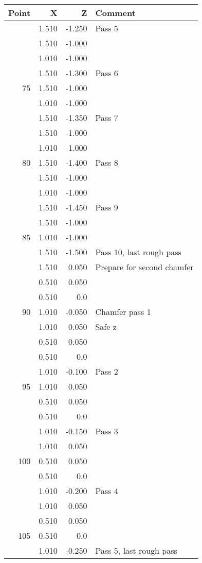 \documentclass{article}
\begin{document}
\newpage

\begin{figure}[H]
\begin{tabular}{rrrl} \toprule
	Point & X & Z & Comment \\ 
	\midrule
	& 1.510 & -1.250 & Pass 5 \\
	& 1.510 & -1.000 & \\
	& 1.010 & -1.000 & \\ 
	& 1.510 & -1.300 & Pass 6\\
	75 & 1.510 & -1.000 & \\
	& 1.010 & -1.000 & \\
	& 1.510 & -1.350 & Pass 7 \\
	& 1.510 & -1.000 & \\
	& 1.010 & -1.000 & \\
	80 & 1.510 & -1.400 & Pass 8 \\
	& 1.510 & -1.000 & \\
	& 1.010 & -1.000 & \\
	& 1.510 & -1.450 & Pass 9 \\
	& 1.510 & -1.000 & \\
	85 & 1.010 & -1.000 & \\
	& 1.510 & -1.500 & Pass 10, last rough pass \\
	& 1.510 & 0.050 & Prepare for second chamfer \\
	& 0.510 & 0.050 & \\
	& 0.510 & 0.0 & \\
	90 & 1.010 & -0.050 & Chamfer pass 1 \\
	& 1.010 & 0.050 & Safe z \\
	& 0.510 & 0.050 & \\
	& 0.510 & 0.0 & \\
	& 1.010 & -0.100 & Pass 2 \\
	95 & 1.010 & 0.050 & \\
	& 0.510 & 0.050 & \\
	& 0.510 & 0.0 & \\
	& 1.010 & -0.150 & Pass 3 \\
	& 1.010 & 0.050 & \\
	100 & 0.510 & 0.050 & \\
	& 0.510 & 0.0 & \\
	& 1.010 & -0.200 & Pass 4 \\
	& 1.010 & 0.050 & \\
	& 0.510 & 0.050 & \\
	105 & 0.510 & 0.0 & \\
	& 1.010 & -0.250 & Pass 5, last rough pass \\

\end{tabular}
\end{figure}
\end{document}
